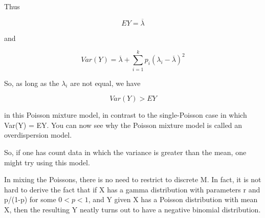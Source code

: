 \documentclass[11pt]{article}
\begin{document}
Thus

\begin{equation}
EY = \overline{\lambda}
\end{equation}

and

\begin{equation}
Var(Y) = \overline{\lambda} + 
\sum_{i=1}^k p_i (\lambda_i - \overline{\lambda})^2
\end{equation}

So, as long as the $\lambda_i$ are not equal, we have

\begin{equation}
Var(Y) > EY
\end{equation}

in this Poisson mixture model, in contrast to the single-Poisson case
in which Var(Y) = EY.  You can now see why the Poisson mixture model is
called an overdispersion model.

So, if one has count data in which the variance is greater than the
mean, one might try using this model.

In mixing the Poissons, there is no need to restrict to discrete M.  In
fact, it is not hard to derive the fact that if X has a gamma
distribution with parameters r and p/(1-p) for some $0 < p < 1$, and Y
given X has a Poisson distribution with mean X, then the resulting Y
neatly turns out to have a negative binomial distribution.


% 
% 
% 
% 
% 

% 
% 
\end{document}
